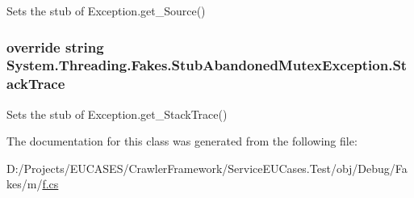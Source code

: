 Sets the stub of Exception.\-get\-\_\-\-Source()

\hypertarget{class_system_1_1_threading_1_1_fakes_1_1_stub_abandoned_mutex_exception_a4ae8f850b38c1ef4a0bccbbe6bbe6155}{
\subsubsection[{Stack\-Trace}]{\setlength{\rightskip}{0pt plus 5cm}override string System.\-Threading.\-Fakes.\-Stub\-Abandoned\-Mutex\-Exception.\-Stack\-Trace\hspace{0.3cm}{\ttfamily [get]}}}\label{class_system_1_1_threading_1_1_fakes_1_1_stub_abandoned_mutex_exception_a4ae8f850b38c1ef4a0bccbbe6bbe6155}


Sets the stub of Exception.\-get\-\_\-\-Stack\-Trace()



The documentation for this class was generated from the following file\-:\begin{DoxyCompactItemize}
\item 
D\-:/\-Projects/\-E\-U\-C\-A\-S\-E\-S/\-Crawler\-Framework/\-Service\-E\-U\-Cases.\-Test/obj/\-Debug/\-Fakes/m/\hyperlink{m_2f_8cs}{f.\-cs}\end{DoxyCompactItemize}
